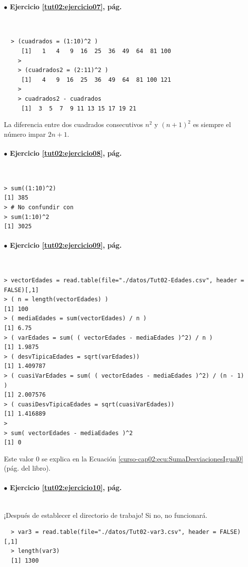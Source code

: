 \documentclass[10pt,a4paper]{article}\usepackage[]{graphicx}\usepackage[]{color}
\begin{document}
\paragraph{\bf $\bullet$ Ejercicio \ref{tut02:ejercicio07}, pág. \pageref{tut02:ejercicio07}}
\label{tut02:ejercicio07:sol}\quad\\
\begin{verbatim}
  > (cuadrados = (1:10)^2 )
     [1]   1   4   9  16  25  36  49  64  81 100
    >
    > (cuadrados2 = (2:11)^2 )
     [1]   4   9  16  25  36  49  64  81 100 121
    >
    > cuadrados2 - cuadrados
     [1]  3  5  7  9 11 13 15 17 19 21
\end{verbatim}
La diferencia entre dos cuadrados consecutivos $n^2$  y $(n+1)^2$ es siempre el número impar $2n+1$.


\paragraph{\bf $\bullet$ Ejercicio \ref{tut02:ejercicio08}, pág. \pageref{tut02:ejercicio08}}
\label{tut02:ejercicio08:sol}\quad\\
\begin{verbatim}
> sum((1:10)^2)
[1] 385
> # No confundir con
> sum(1:10)^2
[1] 3025
\end{verbatim}

\paragraph{\bf $\bullet$ Ejercicio \ref{tut02:ejercicio09}, pág. \pageref{tut02:ejercicio09}}
\label{tut02:ejercicio09:sol}\quad\\
\begin{verbatim}
> vectorEdades = read.table(file="./datos/Tut02-Edades.csv", header = FALSE)[,1]
> ( n = length(vectorEdades) )
[1] 100
> ( mediaEdades = sum(vectorEdades) / n )
[1] 6.75
> ( varEdades = sum( ( vectorEdades - mediaEdades )^2) / n )
[1] 1.9875
> ( desvTipicaEdades = sqrt(varEdades))
[1] 1.409787
> ( cuasiVarEdades = sum( ( vectorEdades - mediaEdades )^2) / (n - 1) )
[1] 2.007576
> ( cuasiDesvTipicaEdades = sqrt(cuasiVarEdades))
[1] 1.416889
>
> sum( vectorEdades - mediaEdades )^2
[1] 0
\end{verbatim}
Este valor $0$ se explica en la Ecuación \ref{curso-cap02:ecu:SumaDesviacionesIgual0} (pág. \pageref{curso-cap02:ecu:SumaDesviacionesIgual0} del libro).

\paragraph{\bf $\bullet$ Ejercicio \ref{tut02:ejercicio10},  pág. \pageref{tut02:ejercicio10}}
\label{tut02:ejercicio10:sol}\quad\\
¡Después de establecer el directorio de trabajo! Si no, no funcionará.
\begin{verbatim}
  > var3 = read.table(file="./datos/Tut02-var3.csv", header = FALSE)[,1]
  > length(var3)
  [1] 1300
\end{verbatim}
\end{document}
